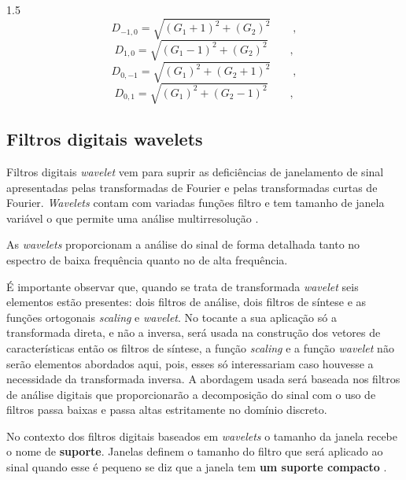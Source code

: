 \documentclass[a4paper,12pt,openright,oneside]{book}
\newenvironment{myenv}[1]
  {\begin{spacing}{#1}}
  {\end{spacing}}
\begin{document}
\begin{myenv}{1.5}
					\begin{equation}
						D_{-1,0}=\sqrt{(G_1+1)^2+(G_2)^2}\qquad,
					\end{equation}
					\begin{equation}
						D_{1,0}=\sqrt{(G_1-1)^2+(G_2)^2}\qquad,
					\end{equation}
					\begin{equation}
						D_{0,-1}=\sqrt{(G_1)^2+(G_2+1)^2}\qquad,		
					\end{equation}
					\begin{equation}
						D_{0,1}=\sqrt{(G_1)^2+(G_2-1)^2}\qquad,
					\end{equation}		

				\subsection{Filtros digitais wavelets}
					\par Filtros digitais \textit{wavelet} vem para suprir as deficiências de janelamento de sinal apresentadas pelas transformadas de Fourier e pelas transformadas curtas de Fourier. \textit{Wavelets} contam com variadas funções filtro e tem tamanho de janela variável o que permite uma análise multirresolução \cite{Rod5254905}.
					
					\par As \textit{wavelets} proporcionam a análise do sinal de forma detalhada tanto no espectro de baixa frequência quanto no de alta frequência.
					
					\par É importante observar que, quando se trata de transformada \textit{wavelet} seis elementos estão presentes: dois filtros de análise, dois filtros de síntese e as funções ortogonais \textit{scaling} e \textit{wavelet}. No tocante a sua aplicação só a transformada direta, e não a inversa, será usada na construção dos vetores de características então os filtros de síntese, a função \textit{scaling} e a função \textit{wavelet} não serão elementos abordados aqui, pois, esses só interessariam caso houvesse a necessidade da transformada inversa. A abordagem usada será baseada nos filtros de análise digitais que proporcionarão a decomposição do sinal com o uso de filtros passa baixas e passa altas estritamente no domínio discreto.
		
					\par No contexto dos filtros digitais baseados em \textit{wavelets} o tamanho da janela recebe o nome de \textbf{suporte}. Janelas definem o tamanho do filtro que será aplicado ao sinal quando esse é pequeno se diz que a janela tem \textbf{um suporte compacto} \cite{robi2003}.
				

\end{myenv}
\end{document}
